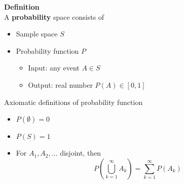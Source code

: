 \begin{framed}
   \textbf{Definition}\\

   A \textbf{probability} space consists of
   \begin{itemize}
      \item Sample space $S$
      \item Probability function $P$ 
         \begin{itemize}
            \item Input: any event $A \in S$
            \item Output: real number $P(A) \in [0, 1]$
         \end{itemize}
   \end{itemize}

   Axiomatic definitions of probability function
   \begin{itemize}
      \item $P(\emptyset) = 0$
      \item $P(S) = 1$
      \item For $A_1, A_2, \hdots$ disjoint, then
         \[
            P( \bigcup_{k=1}^{\infty}A_k) = \sum_{k = 1}^{\infty}P(A_k)
         \] 
   \end{itemize}
\end{framed}
